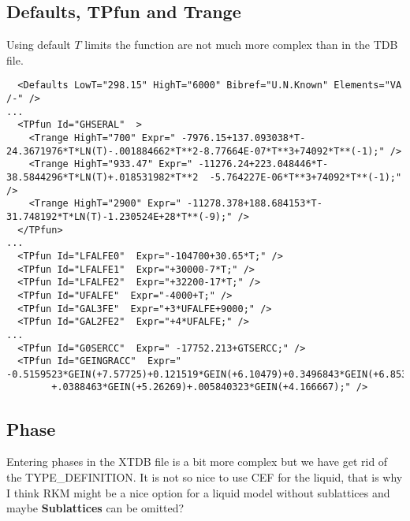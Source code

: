 \documentclass{article}
\begin{document}
\begin{appendices}
\newpage 

\subsection{Defaults, TPfun and Trange}\label{sec:tpfuns}

Using default $T$ limits the function are not much more complex than
in the TDB file.

{\small
\begin{verbatim}
  <Defaults LowT="298.15" HighT="6000" Bibref="U.N.Known" Elements="VA /-" />
...
  <TPfun Id="GHSERAL"  >
    <Trange HighT="700" Expr=" -7976.15+137.093038*T-24.3671976*T*LN(T)-.001884662*T**2-8.77664E-07*T**3+74092*T**(-1);" />
    <Trange HighT="933.47" Expr=" -11276.24+223.048446*T-38.5844296*T*LN(T)+.018531982*T**2  -5.764227E-06*T**3+74092*T**(-1);" />
    <Trange HighT="2900" Expr=" -11278.378+188.684153*T-31.748192*T*LN(T)-1.230524E+28*T**(-9);" />
  </TPfun>
...
  <TPfun Id="LFALFE0"  Expr="-104700+30.65*T;" />
  <TPfun Id="LFALFE1"  Expr="+30000-7*T;" />
  <TPfun Id="LFALFE2"  Expr="+32200-17*T;" />
  <TPfun Id="UFALFE"  Expr="-4000+T;" />
  <TPfun Id="GAL3FE"  Expr="+3*UFALFE+9000;" />
  <TPfun Id="GAL2FE2"  Expr="+4*UFALFE;" />
...
  <TPfun Id="G0SERCC"  Expr=" -17752.213+GTSERCC;" /> 
  <TPfun Id="GEINGRACC"  Expr=" -0.5159523*GEIN(+7.57725)+0.121519*GEIN(+6.10479)+0.3496843*GEIN(+6.8533)
        +.0388463*GEIN(+5.26269)+.005840323*GEIN(+4.166667);" /> 
\end{verbatim}
}

\newpage 

\subsection{Phase}\label{sec:phaseexample}

Entering phases in the XTDB file is a bit more complex but we have get
rid of the TYPE\_DEFINITION.  It is not so nice to use CEF for the
liquid, that is why I think RKM might be a nice option for a liquid
model without sublattices and maybe {\bf Sublattices} can be omitted?


\end{appendices}
\end{document}
